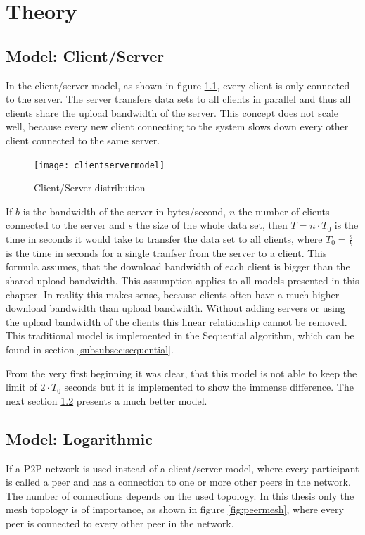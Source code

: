 \chapter{Theory}
\label{ch:theory}

\section{Model: Client/Server}
In the client/server model, as shown in figure \ref{fig:clientservermodel}, every client is only connected to the server. The server transfers data sets to all clients in parallel and thus all clients share the upload bandwidth of the server. This concept does not scale well, because every new client connecting to the system slows down every other client connected to the same server. 

\begin{figure}[H]
\centering
\texttt{[image: clientservermodel]}
\caption{Client/Server distribution}
\label{fig:clientservermodel}
\end{figure}

If $b$ is the bandwidth of the server in bytes/second, $n$ the number of clients connected to the server and $s$ the size of the whole data set, then $T= n \cdot T_0$ is the time in seconds it would take to transfer the data set to all clients, where $T_0=\frac{s}{b}$ is the time in seconds for a single tranfser from the server to a client. This formula assumes, that the download bandwidth of each client is bigger than the shared upload bandwidth. This assumption applies to all models presented in this chapter. In reality this makes sense, because clients often have a much higher download bandwidth than upload bandwidth. Without adding servers or using the upload bandwidth of the clients this linear relationship cannot be removed. This traditional model is implemented in the Sequential algorithm, which can be found in section \ref{subsubsec:sequential}.

From the very first beginning it was clear, that this model is not able to keep the limit of $2 \cdot T_0$ seconds but it is implemented to show the immense difference. The next section \ref{subsubsec:logarithmicmodel} presents a much better model.

\pagebreak
\section{Model: Logarithmic}
\label{subsubsec:logarithmicmodel}
If a P2P network is used instead of a client/server model, where every participant is called a peer and has a connection to one or more other peers in the network. The number of connections depends on the used topology. In this thesis only the mesh topology is of importance, as shown in figure \ref{fig:peermesh}, where every peer is connected to every other peer in the network.

